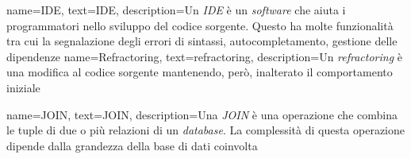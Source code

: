 {
    name=IDE,
    text=IDE,
    description={Un \textit{IDE} è un \textit{software} che aiuta i programmatori nello sviluppo del codice sorgente. Questo ha molte funzionalità tra cui la segnalazione degli errori di sintassi, autocompletamento, gestione delle dipendenze}
}
{
    name=Refractoring,
    text=refractoring,
    description={Un \textit{refractoring} è una modifica al codice sorgente mantenendo, però, inalterato il comportamento iniziale}
}

{
    name=JOIN,
    text=JOIN,
    description={Una \textit{JOIN} è una operazione che combina le tuple di due o più relazioni di un \textit{database}. La complessità di questa operazione dipende dalla grandezza della base di dati coinvolta}
}



